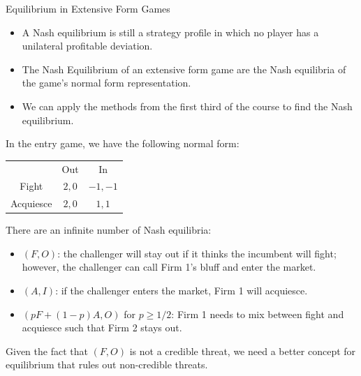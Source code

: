 \documentclass[10pt]{extarticle}
\begin{document}
  \begin{problem}{Equilibrium in Extensive Form Games}
    \begin{itemize}
      \item A Nash equilibrium is still a strategy profile in which no player has a unilateral profitable deviation.
      \item The Nash Equilibrium of an extensive form game are the Nash equilibria of the game's normal form representation.
      \item We can apply the methods from the first third of the course to find the Nash equilibrium.
    \end{itemize}
    In the entry game, we have the following normal form:
    \begin{center}
      \renewcommand{\arraystretch}{1.5}
      \begin{tabular}{c|c|c|}
        \multicolumn{1}{c}{} & \multicolumn{1}{c}{Out} & \multicolumn{1}{c}{In}\\
        \cline{2-3}
        Fight & $2,0$ & $-1,-1$\\
        \cline{2-3}
        Acquiesce & $2,0$ & $1,1$\\
        \cline{2-3}
      \end{tabular}
    \end{center}
    There are an infinite number of Nash equilibria:
    \begin{itemize}
      \item $(F,O)$: the challenger will stay out if it thinks the incumbent will fight; however, the challenger can call Firm 1's bluff and enter the market.
      \item $(A,I)$: if the challenger enters the market, Firm 1 will acquiesce.
      \item $(pF + (1-p)A, O)$ for $p \geq 1/2$: Firm 1 needs to mix between fight and acquiesce such that Firm 2 stays out.
    \end{itemize}
    Given the fact that $(F,O)$ is not a credible threat, we need a better concept for equilibrium that rules out non-credible threats.\newline


\end{problem}
\end{document}
